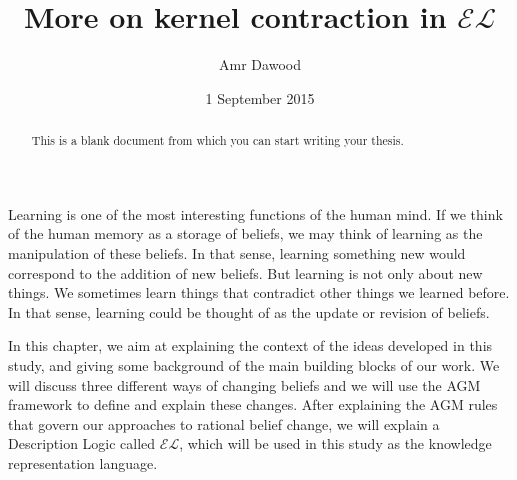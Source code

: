\documentclass{sfuthesis}
\title{More on kernel contraction in $\mathcal{EL}$}
\author{Amr Dawood}
\date{1 September 2015}
\theoremstyle{plain}
\theoremstyle{definition}
\begin{document}
\frontmatter
\maketitle{}
\makecommittee{}

\begin{abstract}
	This is a blank document from which you can start writing your thesis.
\end{abstract}


\begin{dedication} %
\end{dedication}


\begin{acknowledgements} %
\end{acknowledgements}

\tableofcontents\clearpage
{}\listoftables\clearpage
{}\listoffigures





%
%

\mainmatter%






Learning is one of the most interesting functions of the human mind. If we think of the human memory as a storage of beliefs, we may think of learning as the manipulation of these beliefs. In that sense, learning something new would correspond to the addition of new beliefs. But learning is not only about new things. We sometimes learn things that contradict other things we learned before. In that sense, learning could be thought of as the update or revision of beliefs. 

In this chapter, we aim at explaining the context of the ideas developed in this study, and giving some background of the main building blocks of our work. We will discuss three different ways of changing beliefs and we will use the AGM framework\cite{kr} to define and explain these changes. After explaining the AGM rules that govern our approaches to rational belief change, we will explain a Description Logic called $\mathcal{EL}$, which will be used in this study as the knowledge representation language.
\end{document}
